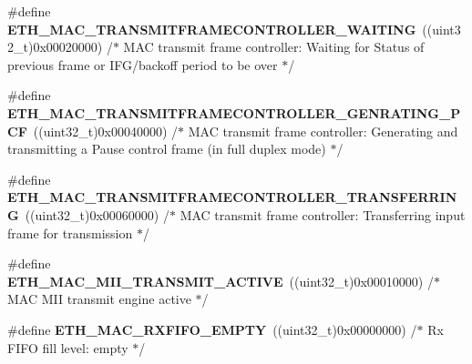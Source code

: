 \begin{DoxyCompactItemize}
\item 
\mbox{\label{group___h_a_l___e_t_h___aliased___defines_ga51af5af4f0244add557e29f1c1085c76}} 
\#define {\bfseries E\+T\+H\+\_\+\+M\+A\+C\+\_\+\+T\+R\+A\+N\+S\+M\+I\+T\+F\+R\+A\+M\+E\+C\+O\+N\+T\+R\+O\+L\+L\+E\+R\+\_\+\+W\+A\+I\+T\+I\+NG}~((uint32\+\_\+t)0x00020000)  /$\ast$ M\+A\+C transmit frame controller\+: Waiting for Status of previous frame or I\+F\+G/backoff period to be over $\ast$/
\item 
\mbox{\label{group___h_a_l___e_t_h___aliased___defines_ga30f5421c685cc87345a62034f03e9ede}} 
\#define {\bfseries E\+T\+H\+\_\+\+M\+A\+C\+\_\+\+T\+R\+A\+N\+S\+M\+I\+T\+F\+R\+A\+M\+E\+C\+O\+N\+T\+R\+O\+L\+L\+E\+R\+\_\+\+G\+E\+N\+R\+A\+T\+I\+N\+G\+\_\+\+P\+CF}~((uint32\+\_\+t)0x00040000)  /$\ast$ M\+A\+C transmit frame controller\+: Generating and transmitting a Pause control frame (in full duplex mode) $\ast$/
\item 
\mbox{\label{group___h_a_l___e_t_h___aliased___defines_ga813acc11409391a70e9c8f4e2c769cf1}} 
\#define {\bfseries E\+T\+H\+\_\+\+M\+A\+C\+\_\+\+T\+R\+A\+N\+S\+M\+I\+T\+F\+R\+A\+M\+E\+C\+O\+N\+T\+R\+O\+L\+L\+E\+R\+\_\+\+T\+R\+A\+N\+S\+F\+E\+R\+R\+I\+NG}~((uint32\+\_\+t)0x00060000)  /$\ast$ M\+A\+C transmit frame controller\+: Transferring input frame for transmission $\ast$/
\item 
\mbox{\label{group___h_a_l___e_t_h___aliased___defines_ga569a78f6147f1068ddeed3897776b6f3}} 
\#define {\bfseries E\+T\+H\+\_\+\+M\+A\+C\+\_\+\+M\+I\+I\+\_\+\+T\+R\+A\+N\+S\+M\+I\+T\+\_\+\+A\+C\+T\+I\+VE}~((uint32\+\_\+t)0x00010000)  /$\ast$ M\+A\+C M\+I\+I transmit engine active $\ast$/
\item 
\mbox{\label{group___h_a_l___e_t_h___aliased___defines_gab0663cbb0510f2d3bdc9fdaea103725e}} 
\#define {\bfseries E\+T\+H\+\_\+\+M\+A\+C\+\_\+\+R\+X\+F\+I\+F\+O\+\_\+\+E\+M\+P\+TY}~((uint32\+\_\+t)0x00000000)  /$\ast$ Rx F\+I\+F\+O fill level\+: empty $\ast$/
\item 
\mbox{\label{group___h_a_l___e_t_h___aliased___defines_ga1ac34f74c22709a45510fe557e6b1866}} 

\end{DoxyCompactItemize}
